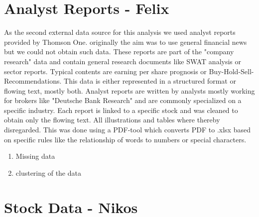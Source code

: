 \section{Analyst Reports - Felix}
As the second external data source for this analysis we used analyst reports provided by Thomson One. originally the aim was to use general financial news but we could not obtain such data. These reports are part of the "company research" data and contain general research documents like SWAT analysis or sector reports. Typical contents are earning per share prognosis or Buy-Hold-Sell-Recommendations. This data is either represented in a structured format or flowing text, mostly both. Analyst reports are written by analysts mostly working for brokers like "Deutsche Bank Research" and are commonly specialized on a specific industry.  Each report is linked to a specific stock and was cleaned to obtain only the flowing text. All illustrations and tables where thereby disregarded. This was done using a PDF-tool which converts PDF to .xlsx based on specific rules like the relationship of words to numbers or special characters. 

\begin{enumerate}
    \item Missing data
    \item clustering of the data
\end{enumerate}


\section{Stock Data - Nikos}
